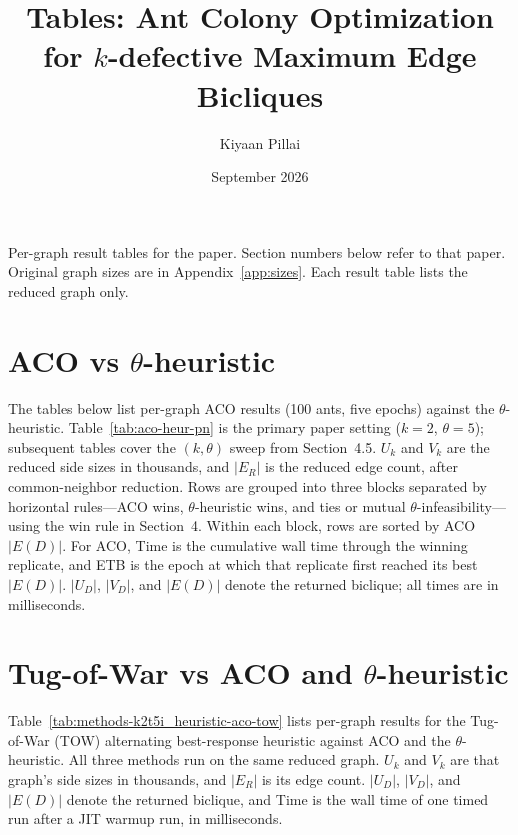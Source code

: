 \documentclass[conference]{IEEEtran}
\title{Tables: Ant Colony Optimization for $k$-defective Maximum Edge Bicliques}
\author{Kiyaan Pillai}
\date{September 2026}
\begin{document}
\maketitle

Per-graph result tables for the paper. Section numbers below refer to that paper. Original graph sizes are in Appendix~\ref{app:sizes}. Each result table lists the reduced graph only.

\section{ACO vs $\theta$-heuristic}
The tables below list per-graph ACO results (100 ants, five epochs) against the $\theta$-heuristic. Table~\ref{tab:aco-heur-pn} is the primary paper setting ($k=2$, $\theta=5$); subsequent tables cover the $(k, \theta)$ sweep from Section~4.5. $U_k$ and $V_k$ are the reduced side sizes in thousands, and $|E_R|$ is the reduced edge count, after common-neighbor reduction.
Rows are grouped into three blocks separated by horizontal rules---ACO wins, $\theta$-heuristic wins, and ties or mutual $\theta$-infeasibility---using the win rule in Section~4. Within each block, rows are sorted by ACO $|E(D)|$.
For ACO, Time is the cumulative wall time through the winning replicate, and ETB is the epoch at which that replicate first reached its best $|E(D)|$. $|U_D|$, $|V_D|$, and $|E(D)|$ denote the returned biclique; all times are in milliseconds.

\section{Tug-of-War vs ACO and $\theta$-heuristic}
Table~\ref{tab:methods-k2t5i_heuristic-aco-tow} lists per-graph results for the Tug-of-War (TOW) alternating best-response heuristic against ACO and the $\theta$-heuristic. All three methods run on the same reduced graph. $U_k$ and $V_k$ are that graph's side sizes in thousands, and $|E_R|$ is its edge count. $|U_D|$, $|V_D|$, and $|E(D)|$ denote the returned biclique, and Time is the wall time of one timed run after a JIT warmup run, in milliseconds.
\end{document}
